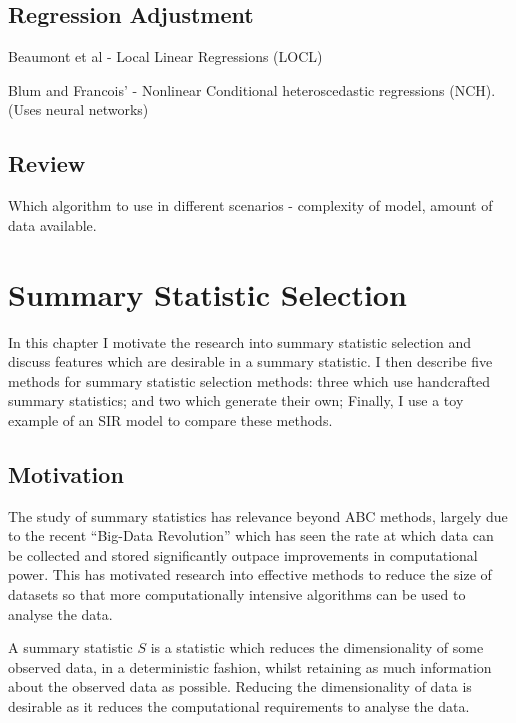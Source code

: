 \documentclass[11pt,a4paper,margin=0]{article}
\begin{document}
\subsection*{Regression Adjustment}

  \par Beaumont et al - Local Linear Regressions (LOCL)
  \par Blum and Francois' - Nonlinear Conditional heteroscedastic regressions (NCH). (Uses neural networks)

\subsection*{Review}\label{sec_ABC_review}

  Which algorithm to use in different scenarios - complexity of model, amount of data available.

\newpage
\section{Summary Statistic Selection}\label{sec_summary_stats}

In this chapter I motivate the research into summary statistic selection and discuss features which are desirable in a summary statistic. I then describe five methods for summary statistic selection methods: three which use handcrafted summary statistics; and two which generate their own; Finally, I use a toy example of an SIR model to compare these methods.

\subsection*{Motivation}\label{sec_summary_stats_motivation}

The study of summary statistics has relevance beyond ABC methods, largely due to the recent ``Big-Data Revolution'' which has seen the rate at which data can be collected and stored significantly outpace improvements in computational power. This has motivated research into effective methods to reduce the size of datasets so that more computationally intensive algorithms can be used to analyse the data. %

\par A summary statistic $S$ is a statistic which reduces the dimensionality of some observed data, in a deterministic fashion, whilst retaining as much information about the observed data as possible. Reducing the dimensionality of data is desirable as it reduces the computational requirements to analyse the data.
\end{document}

